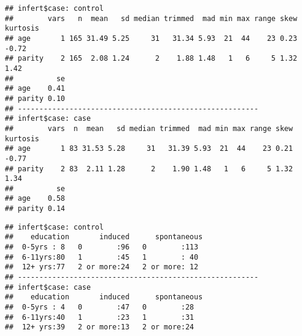 \documentclass[]{book}
\newenvironment{Shaded}{\begin{snugshade}}{\end{snugshade}}
\newcommand{\KeywordTok}[1]{\textcolor[rgb]{0.13,0.29,0.53}{\textbf{#1}}}
\newcommand{\StringTok}[1]{\textcolor[rgb]{0.31,0.60,0.02}{#1}}
\newcommand{\ControlFlowTok}[1]{\textcolor[rgb]{0.13,0.29,0.53}{\textbf{#1}}}
\newcommand{\OperatorTok}[1]{\textcolor[rgb]{0.81,0.36,0.00}{\textbf{#1}}}
\newcommand{\NormalTok}[1]{#1}
\theoremstyle{definition}
\theoremstyle{definition}
\theoremstyle{remark}
\begin{document}
\begin{Shaded}
\end{Shaded}

\begin{verbatim}
## infert$case: control
##        vars   n  mean   sd median trimmed  mad min max range skew kurtosis
## age       1 165 31.49 5.25     31   31.34 5.93  21  44    23 0.23    -0.72
## parity    2 165  2.08 1.24      2    1.88 1.48   1   6     5 1.32     1.42
##          se
## age    0.41
## parity 0.10
## -------------------------------------------------------- 
## infert$case: case
##        vars  n  mean   sd median trimmed  mad min max range skew kurtosis
## age       1 83 31.53 5.28     31   31.39 5.93  21  44    23 0.21    -0.77
## parity    2 83  2.11 1.28      2    1.90 1.48   1   6     5 1.32     1.34
##          se
## age    0.58
## parity 0.14
\end{verbatim}

\begin{Shaded}
\end{Shaded}

\begin{verbatim}
## infert$case: control
##    education       induced      spontaneous 
##  0-5yrs : 8   0        :96   0        :113  
##  6-11yrs:80   1        :45   1        : 40  
##  12+ yrs:77   2 or more:24   2 or more: 12  
## -------------------------------------------------------- 
## infert$case: case
##    education       induced      spontaneous
##  0-5yrs : 4   0        :47   0        :28  
##  6-11yrs:40   1        :23   1        :31  
##  12+ yrs:39   2 or more:13   2 or more:24
\end{verbatim}

\begin{Shaded}
\end{Shaded}
\end{document}

